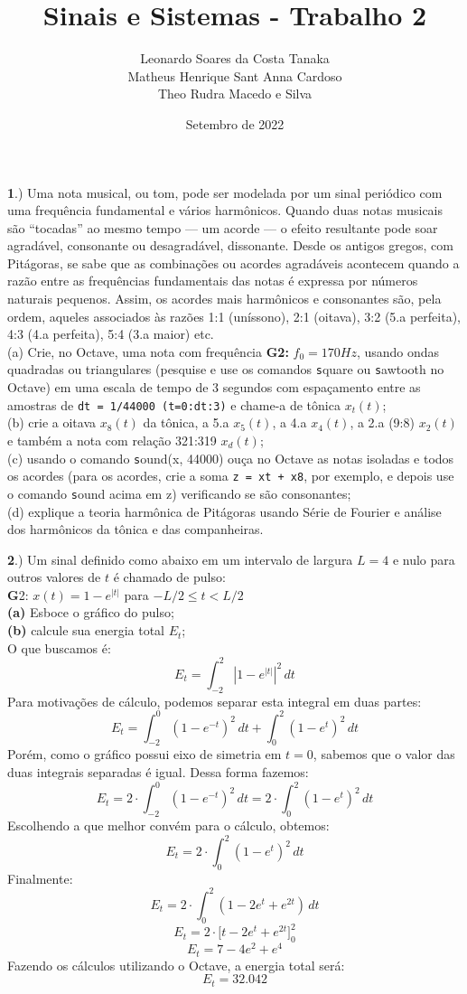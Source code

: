 \documentclass[10pt, a4paper]{article}
\title{Sinais e Sistemas - Trabalho 2}
\author{
    Leonardo Soares da Costa Tanaka\\
    Matheus Henrique Sant Anna Cardoso \\
    Theo Rudra Macedo e Silva
}
\date{Setembro de 2022}
\begin{document}
\maketitle

{\textbf 1.)} Uma nota musical, ou tom, pode ser modelada por um sinal periódico com uma frequência fundamental e vários harmônicos. Quando duas notas musicais são “tocadas” ao mesmo tempo — um acorde — o efeito resultante pode soar agradável, consonante ou desagradável, dissonante. Desde os antigos gregos, com Pitágoras, se sabe que as combinações ou acordes agradáveis acontecem quando a razão entre as frequências fundamentais das notas é expressa por números naturais pequenos. Assim, os acordes mais harmônicos e consonantes são, pela ordem, aqueles associados às razões 1:1 (uníssono), 2:1 (oitava), 3:2 (5.a perfeita), 4:3 (4.a perfeita), 5:4 (3.a maior) etc.\\
(a) Crie, no Octave, uma nota com frequência \textbf{G2:} $f_{0} = 170Hz$, usando ondas quadradas ou triangulares (pesquise e use os comandos {\texttt square} ou {\texttt sawtooth} no Octave) em uma escala de tempo de 3 segundos com espaçamento entre as amostras de {\texttt{dt = 1/44000 (t=0:dt:3)}} e chame-a de tônica $x_{t}(t)$;\\
(b) crie a oitava $x_{8}(t)$ da tônica, a 5.a $x_{5}(t)$, a 4.a $x_{4}(t)$, a 2.a (9:8) $x_{2}(t)$ e também a nota com relação 321:319 $x_{d}(t)$;\\
(c) usando o comando {\texttt sound(x, 44000)} ouça no Octave as notas isoladas e todos os acordes (para os acordes, crie a soma {\texttt{z = xt + x8}}, por exemplo, e depois use o comando {\texttt sound} acima em z) verificando se são consonantes;\\
(d) explique a teoria harmônica de Pitágoras usando Série de Fourier e análise dos harmônicos da tônica e das companheiras.

\vspace{\baselineskip}
{\textbf 2.)} Um sinal definido como abaixo em um intervalo de largura $L = 4$ e nulo para outros valores de $t$ é chamado de pulso:\\
{\textbf G2:} $x(t) = 1 - e^{|t|}$ para $- L/2 \leq t < L/2$\\
{\textbf{(a)}} Esboce o gráfico do pulso;\\
{\textbf{(b)}} calcule sua energia total $E_{t}$;\\
O que buscamos é:
\[E_{t} = \int_{-2}^{2} |1 - e^{|t|}|^2\,dt\]
Para motivações de cálculo, podemos separar esta integral em duas partes:
\[E_{t} = \int_{-2}^{0} (1 - e^{-t})^{2}\,dt + \int_{0}^{2} (1 - e^{t})^{2}\,dt\]
Porém, como o gráfico possui eixo de simetria em $t = 0$, sabemos que o valor das duas integrais separadas é igual. Dessa forma fazemos:
\[E_{t} = 2 \cdot \int_{-2}^{0} (1 - e^{-t})^{2}\,dt = 2 \cdot \int_{0}^{2} (1 - e^{t})^{2}\,dt\]
Escolhendo a que melhor convém para o cálculo, obtemos:
\[E_{t} = 2 \cdot \int_{0}^{2} (1 - e^{t})^{2}\,dt\]
Finalmente:
\[E_{t} = 2 \cdot \int_{0}^{2} (1 - 2e^t + e^{2t})\,dt\]
\[E_{t} = 2 \cdot \bigl[t - 2e^t + e^{2t} \bigr]_{0}^{2}\]
\[E_{t} = 7 - 4e^2 + e^{4}\]
Fazendo os cálculos utilizando o Octave, a energia total será:
\[E_{t} = 32.042\]
\end{document}
